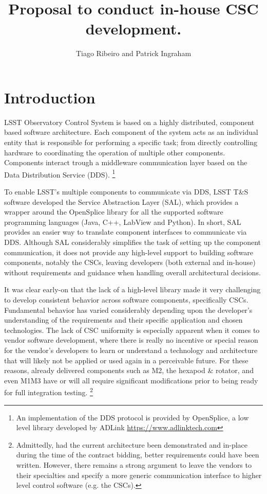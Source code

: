 \documentclass[TS,authoryear,toc]{lsstdoc}
\title{Proposal to conduct in-house CSC development.}
\author{%
Tiago Ribeiro and 
Patrick Ingraham
}
\date{\vcsDate}
\begin{document}
\maketitle


\section{Introduction}

LSST Observatory Control System is based on a highly distributed, component based software architecture. Each component of the system acts as an individual entity that is responsible for performing a specific task; from directly controlling hardware to coordinating the operation of multiple other components. Components interact trough a middleware communication layer based on the Data Distribution Service (DDS). \footnote{An implementation of the DDS protocol is provided by OpenSplice, a low level library developed by ADLink \url{https://www.adlinktech.com}} 

To enable LSST's multiple components to communicate via DDS, LSST T\&S software developed the Service Abstraction Layer (SAL), which provides a wrapper around the OpenSplice library for all the supported software programming languages (Java, C++, LabView and Python). In short, SAL provides an easier way to translate component interfaces to communicate via DDS. Although SAL considerably simplifies the task of setting up the component communication, it does not provide any high-level support to building software components, notably the CSCs, leaving developers (both external and in-house) without requirements and guidance when handling overall architectural decisions. 

It was clear early-on that the lack of a high-level library made it very challenging to develop consistent behavior across software components, specifically CSCs. Fundamental behavior has varied considerably depending upon the developer's understanding of the requirements and their specific application and chosen technologies. The lack of CSC uniformity is especially apparent when it comes to vendor software development, where there is really no incentive or special reason for the vendor's developers to learn or understand a technology and architecture that will likely not be applied or used again in a perceivable future. For these reasons, already delivered components such as M2, the hexapod \& rotator, and even M1M3 have or will all require significant modifications prior to being ready for full integration testing. \footnote{Admittedly, had the current architecture been demonstrated and in-place during the time of the contract bidding, better requirements could have been written. However, there remains a strong argument to leave the vendors to their specialties and specify a more generic communication interface to higher level control software (e.g. the CSCs).} 
\end{document}

